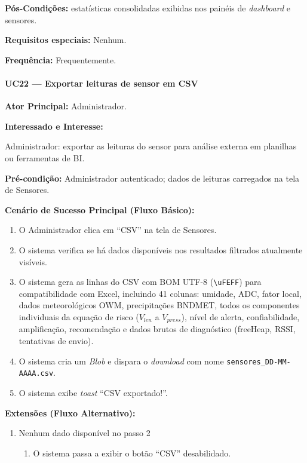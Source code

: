 \textbf{Pós-Condições:} estatísticas consolidadas exibidas
nos painéis de \textit{dashboard} e sensores.

\textbf{Requisitos especiais:} Nenhum.

\textbf{Frequência:} Frequentemente.

\paragraph{UC22 --- Exportar leituras de sensor em CSV}\hfill\break

\textbf{Ator Principal:} Administrador.

\textbf{Interessado e Interesse:}

Administrador: exportar as leituras do sensor para análise
externa em planilhas ou ferramentas de BI.

\textbf{Pré-condição:} Administrador autenticado; dados de
leituras carregados na tela de Sensores.

\textbf{Cenário de Sucesso Principal (Fluxo Básico):}
\begin{enumerate}
  \item O Administrador clica em ``CSV'' na
        tela de Sensores.
  \item O sistema verifica se há dados disponíveis nos
        resultados filtrados atualmente visíveis.
  \item O sistema gera as linhas do CSV com BOM UTF-8
        (\texttt{\textbackslash uFEFF}) para
        compatibilidade com Excel, incluindo 41 colunas:
        umidade, ADC, fator local, dados meteorológicos
        OWM, precipitações BNDMET, todos os componentes
        individuais da equação de risco ($V_{len}$ a
        $V_{press}$), nível de alerta, confiabilidade,
        amplificação, recomendação e dados brutos de
        diagnóstico (freeHeap, RSSI, tentativas de envio).
  \item O sistema cria um \textit{Blob} e dispara o
        \textit{download} com nome
        \texttt{sensores\_DD-MM-AAAA.csv}.
  \item O sistema exibe \textit{toast} ``CSV exportado!''.
\end{enumerate}

\textbf{Extensões (Fluxo Alternativo):}

\begin{enumerate}
  \renewcommand{\theenumi}{2a}
  \renewcommand{\labelenumi}{\theenumi.}
  \item Nenhum dado disponível no passo 2
  \begin{enumerate}
  \item O sistema passa a exibir o botão ``CSV'' desabilidado.
  \end{enumerate}
\end{enumerate}

